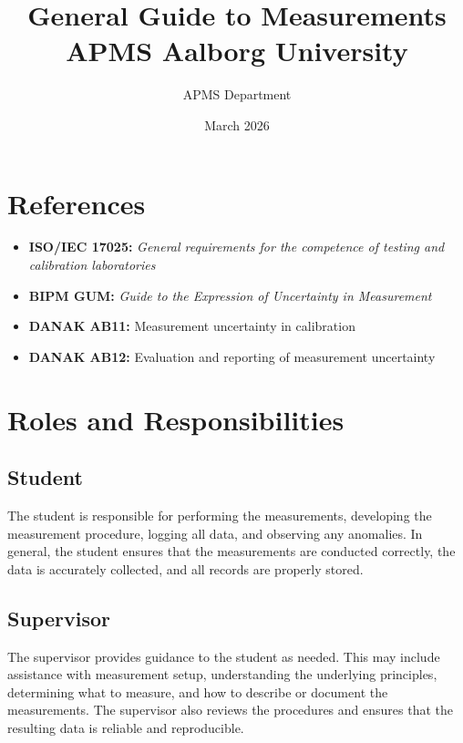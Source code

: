 \documentclass[12pt,a4paper]{article}
\title{General Guide to Measurements \\ APMS Aalborg University}
\author{APMS Department}
\date{March 2026}
\begin{document}
\maketitle
\tableofcontents
\newpage











\section{References}
\begin{itemize}[noitemsep]
    \item \textbf{ISO/IEC 17025:} \textit{General requirements for the competence of testing and calibration laboratories}
    \item \textbf{BIPM GUM:} \textit{Guide to the Expression of Uncertainty in Measurement}
    \item \textbf{DANAK AB11:} Measurement uncertainty in calibration
    \item \textbf{DANAK AB12:} Evaluation and reporting of measurement uncertainty
\end{itemize}



\section{Roles and Responsibilities}

\subsection{Student}
The student is responsible for performing the measurements, developing the measurement procedure, logging all data, and observing any anomalies. In general, the student ensures that the measurements are conducted correctly, the data is accurately collected, and all records are properly stored.

\subsection{Supervisor}
The supervisor provides guidance to the student as needed. This may include assistance with measurement setup, understanding the underlying principles, determining what to measure, and how to describe or document the measurements. The supervisor also reviews the procedures and ensures that the resulting data is reliable and reproducible.
\end{document}
